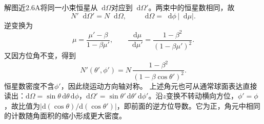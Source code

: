 \documentclass[UTF8,fontset=fandol,a4paper,11pt]{ctexart}
\newcommand{\dd}{\mathop{}\!\mathrm{d}}
\begin{document}
解图近2.6A将同一小束恒星从$\dd\Omega$对应到$\dd\Omega'$。两束中的恒星数相同，故
\[
N'\dd\Omega'=N\dd\Omega,\qquad
\dd\Omega=\dd\phi\,|\dd\mu|.
\]
逆变换为
\[
\mu=\frac{\mu'-\beta}{1-\beta\mu'},\qquad
\frac{\dd\mu}{\dd\mu'}=
\frac{1-\beta^2}{(1-\beta\mu')^2}.
\]
又因方位角不变，得到
\[
\boxed{N'(\theta',\phi')=
N\,\frac{1-\beta^2}{(1-\beta\cos\theta')^2}}.
\]
恒星数密度不含$\phi'$，因此绕运动方向轴对称。
上述角元也可从通常球面表达直接读出：$\mathrm d\Omega=\sin\theta\,\mathrm d\theta\,\mathrm d\phi$，$\mathrm d\Omega'=\sin\theta'\,\mathrm d\theta'\,\mathrm d\phi'$。沿$z$变换不转动横向方位，$\phi'=\phi$，故比值为$|\mathrm d(\cos\theta)/\mathrm d(\cos\theta')|$，即前面的逆方位导数。它为正，角元中相同的计数随角面积的缩小形成更大密度。


\begin{center}\begin{minipage}{.98\linewidth}\centering
\begin{tikzpicture}[scale=.9,transform shape]

\end{tikzpicture}
\end{minipage}
\end{center}
\end{document}
